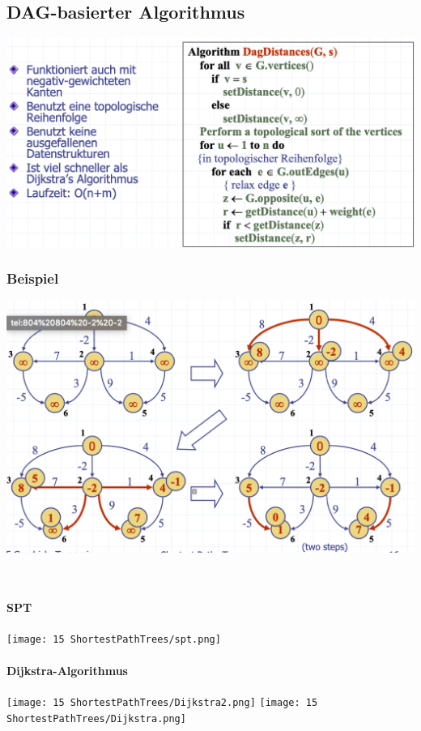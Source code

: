 \subsection{DAG-basierter Algorithmus}
\begin{center}
    \includegraphics[scale=.32]{graphic/15 ShortestPathTrees/DAG1.png}
\end{center}
\vspace{-8pt}
\subsubsection{Beispiel}
\begin{center}
    \includegraphics[scale=.3]{graphic/15 ShortestPathTrees/DAG2.png}
\end{center}
\vspace{-8pt}

\vfill
$ $
\columnbreak
\paragraph{SPT}
\begin{center}
    \texttt{[image: 15 ShortestPathTrees/spt.png]}
\end{center}

\paragraph{Dijkstra-Algorithmus}
\begin{center}
    \texttt{[image: 15 ShortestPathTrees/Dijkstra2.png]}
    \texttt{[image: 15 ShortestPathTrees/Dijkstra.png]}
\end{center}
\newpage